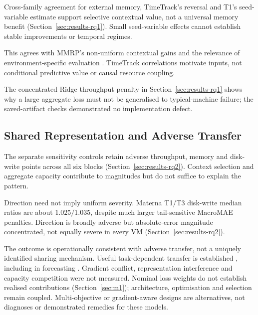 \documentclass[a4paper,fleqn]{cas-dc}
\begin{document}
Cross-family agreement for external memory, TimeTrack's reversal and T1's
seed-variable estimate support selective contextual value, not a universal
memory benefit (Section~\ref{sec:results-rq1}). Small seed-variable effects
cannot establish stable improvements or temporal regimes.

This agrees with MMRP's non-uniform contextual gains \citep{Tripathi2025MMRP}
and the relevance of environment-specific evaluation
\citep{Rossi2025CloudUncertainty}. TimeTrack correlations
\citep{Meliani2025TimeTrack} motivate inputs, not conditional predictive value
or causal resource coupling.

The concentrated Ridge throughput penalty in Section~\ref{sec:results-rq1}
shows why a large aggregate loss must not be generalised to typical-machine
failure; the saved-artifact checks demonstrated no implementation defect.

\subsection{Shared Representation and Adverse Transfer}
\label{sec:discussion-sharing}

The separate sensitivity controls retain adverse throughput, memory and
disk-write points across all six blocks (Section~\ref{sec:results-rq2}).
Context selection and aggregate capacity contribute to magnitudes but do not
suffice to explain the pattern.

Direction need not imply uniform severity. Materna T1/T3 disk-write median
ratios are about $1.025/1.035$, despite much larger tail-sensitive MacroMAE penalties.
Direction is broadly adverse but absolute-error magnitude concentrated,
not equally severe in every VM (Section~\ref{sec:results-rq2}).

The outcome is operationally consistent with adverse transfer, not a uniquely
identified sharing mechanism. Useful task-dependent transfer is established
\citep{Caruana1997Multitask,Standley2020TaskGrouping,Fifty2021TaskGroupings},
including in forecasting \citep{Nikentari2022NARMAXLSTM,Nochumsohn2025MTLinear}.
Gradient conflict, representation interference and capacity competition were
not measured. Nominal loss weights do not establish realised contributions
(Section~\ref{sec:m1}); architecture, optimisation and selection remain coupled.
Multi-objective or gradient-aware designs
\citep{Sener2018MultiObjective,Yu2020GradientSurgery} are alternatives, not
diagnoses or demonstrated remedies for these models.
\end{document}
